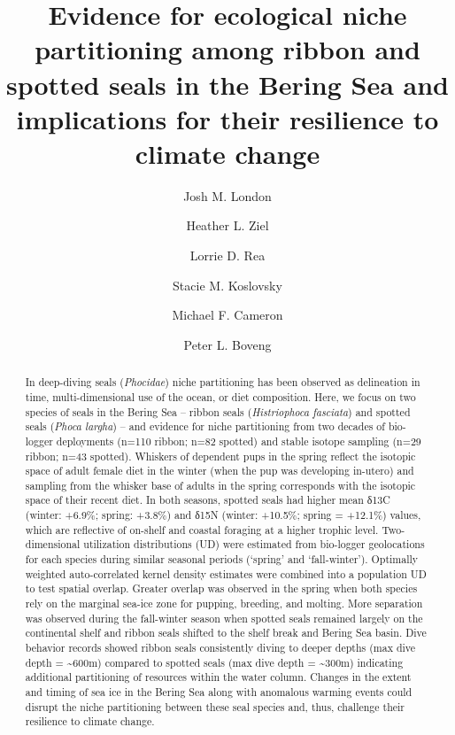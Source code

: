 \documentclass[
  authoryear,
  preprint,
  3p,
  onecolumn]{elsarticle}
\begin{document}
\begin{frontmatter}
\title{Evidence for ecological niche partitioning among ribbon and
spotted seals in the Bering Sea and implications for their resilience to
climate change}
\author[1]{Josh M. London%
%
}
\author[1]{Heather L. Ziel%
%
}
\author[2]{Lorrie D. Rea%
%
}
\author[1]{Stacie M. Koslovsky%
%
}
\author[1]{Michael F. Cameron%
%
}
\author[1]{Peter L. Boveng%
%
}








        
\begin{abstract}
In deep-diving seals (\emph{Phocidae}) niche partitioning has been
observed as delineation in time, multi-dimensional use of the ocean, or
diet composition. Here, we focus on two species of seals in the Bering
Sea -- ribbon seals (\emph{Histriophoca fasciata}) and spotted seals
(\emph{Phoca largha}) -- and evidence for niche partitioning from two
decades of bio-logger deployments (n=110 ribbon; n=82 spotted) and
stable isotope sampling (n=29 ribbon; n=43 spotted). Whiskers of
dependent pups in the spring reflect the isotopic space of adult female
diet in the winter (when the pup was developing in-utero) and sampling
from the whisker base of adults in the spring corresponds with the
isotopic space of their recent diet. In both seasons, spotted seals had
higher mean δ13C (winter: +6.9\%; spring: +3.8\%) and δ15N (winter:
+10.5\%; spring = +12.1\%) values, which are reflective of on-shelf and
coastal foraging at a higher trophic level. Two-dimensional utilization
distributions (UD) were estimated from bio-logger geolocations for each
species during similar seasonal periods (`spring' and `fall-winter').
Optimally weighted auto-correlated kernel density estimates were
combined into a population UD to test spatial overlap. Greater overlap
was observed in the spring when both species rely on the marginal
sea-ice zone for pupping, breeding, and molting. More separation was
observed during the fall-winter season when spotted seals remained
largely on the continental shelf and ribbon seals shifted to the shelf
break and Bering Sea basin. Dive behavior records showed ribbon seals
consistently diving to deeper depths (max dive depth =
\textasciitilde600m) compared to spotted seals (max dive depth =
\textasciitilde300m) indicating additional partitioning of resources
within the water column. Changes in the extent and timing of sea ice in
the Bering Sea along with anomalous warming events could disrupt the
niche partitioning between these seal species and, thus, challenge their
resilience to climate change.


\end{abstract}
\end{frontmatter}
\end{document}
